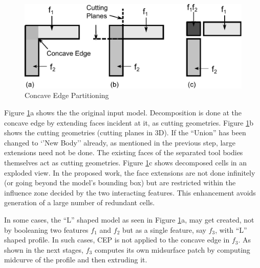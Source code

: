 \begin{itemize}[noitemsep,topsep=2pt,parsep=2pt,partopsep=2pt]




  \begin{figure}[!h]
\centering     %
\includegraphics[width=0.75\linewidth,valign=t]{../Common/images/newcep_bw.pdf}
\caption{Concave Edge Partitioning}
\label{fig:litsurvey:newcep}
\end{figure}



Figure \ref{fig:litsurvey:newcep}a shows the the original input model. Decomposition is done at the concave edge by extending faces incident at it, as cutting geometries. Figure \ref{fig:litsurvey:newcep}b shows the cutting geometries (cutting planes in 3D). If the ``Union'' has been changed to `'New Body'' already, as mentioned in the previous step, large extensions need not be done. The existing faces of the separated tool bodies themselves act as cutting geometries.  Figure \ref{fig:litsurvey:newcep}c  shows decomposed cells in an exploded view. In the proposed work, the face extensions are not done infinitely (or going beyond the model's bounding box) but are restricted within the influence zone decided by the two interacting features. This enhancement avoids generation of a large number of redundant cells.
\end{itemize}

In some cases, the ``L'' shaped model as seen in Figure \ref{fig:litsurvey:newcep}a, may get created, not by booleaning two features $f_1$ and $f_2$ but as a single feature, say $f_3$, with ``L'' shaped profile. In such cases, CEP is not applied to the concave edge in $f_3$. As shown in the next stages, $f_3$ computes its own midsurface patch by computing midcurve of the profile and then extruding it.%

